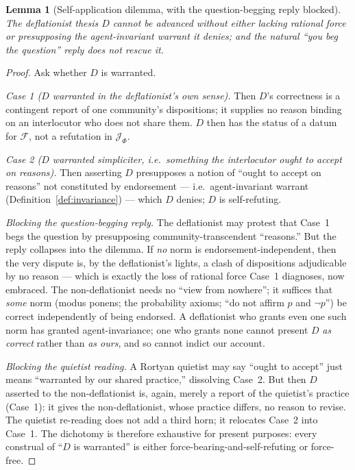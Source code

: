 \documentclass{amsart}
\theoremstyle{definition}
\theoremstyle{plain}
\newtheorem{lemma}{Lemma}
\theoremstyle{remark}
\begin{document}
\begin{lemma}[Self-application dilemma, with the question-begging reply blocked]
\label{lem:selfapp}
The deflationist thesis $D$ cannot be advanced without either lacking rational
force or presupposing the agent-invariant warrant it denies; and the natural
``you beg the question'' reply does not rescue it.
\end{lemma}

\begin{proof}
Ask whether $D$ is warranted.

\emph{Case 1 ($D$ warranted in the deflationist's own sense).} Then $D$'s
correctness is a contingent report of one community's dispositions; it supplies
no reason binding on an interlocutor who does not share them. $D$ then has the
status of a datum for $\mathcal{F}$, not a refutation in $\mathcal{J}_\Phi$.

\emph{Case 2 ($D$ warranted simpliciter, i.e.\ something the interlocutor ought
to accept on reasons).} Then asserting $D$ presupposes a notion of ``ought to
accept on reasons'' not constituted by endorsement --- i.e.\
agent-invariant warrant (Definition~\ref{def:invariance}) --- which $D$ denies;
$D$ is self-refuting.

\emph{Blocking the question-begging reply.} The deflationist may protest that
Case~1 begs the question by presupposing community-transcendent ``reasons.''
But the reply collapses into the dilemma. If \emph{no} norm is
endorsement-independent, then the very dispute is, by the deflationist's lights,
a clash of dispositions adjudicable by no reason --- which is exactly the loss
of rational force Case~1 diagnoses, now embraced. The non-deflationist needs no
``view from nowhere''; it suffices that \emph{some} norm (modus ponens; the
probability axioms; ``do not affirm $p$ and $\neg p$'') be correct
independently of being endorsed. A deflationist who grants even one such norm
has granted agent-invariance; one who grants none cannot present $D$ \emph{as
correct} rather than \emph{as ours}, and so cannot indict our account.

\emph{Blocking the quietist reading.} A Rortyan quietist may say ``ought to
accept'' just means ``warranted by our shared practice,'' dissolving Case~2.
But then $D$ asserted to the non-deflationist is, again, merely a report of the
quietist's practice (Case~1): it gives the non-deflationist, whose practice
differs, no reason to revise. The quietist re-reading does not add a third
horn; it relocates Case~2 into Case~1. The dichotomy is therefore exhaustive
for present purposes: every construal of ``$D$ is warranted'' is either
force-bearing-and-self-refuting or force-free.
\end{proof}
\end{document}
